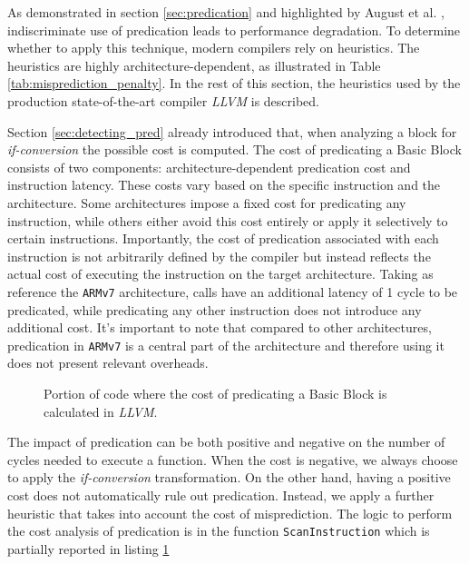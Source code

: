 As demonstrated in section \ref{sec:predication} and highlighted by August et al. \cite{August98}, indiscriminate use of predication leads to performance degradation.
To determine whether to apply this technique, modern compilers rely on heuristics. The heuristics are highly architecture-dependent, as illustrated in Table \ref{tab:misprediction_penalty}. In the rest of this section, the heuristics used by the production state-of-the-art compiler \textit{LLVM} is described.

Section \ref{sec:detecting_pred} already introduced that, when analyzing a block for \textit{if-conversion} the possible cost is computed. The cost of predicating a Basic Block consists of two components: architecture-dependent predication cost and instruction latency. These costs vary based on the specific instruction and the architecture. Some architectures impose a fixed cost for predicating any instruction, while others either avoid this cost entirely or apply it selectively to certain instructions. Importantly, the cost of predication associated with each instruction is not arbitrarily defined by the compiler but instead reflects the actual cost of executing the instruction on the target architecture. Taking as reference the \texttt{ARMv7} architecture, calls have an additional latency of 1 cycle to be predicated, while predicating any other instruction does not introduce any additional cost. It's important to note that compared to other architectures, predication in \texttt{ARMv7} is a central part of the architecture and therefore using it does not present relevant overheads.

\begin{figure}[H]
    \centering
    
    \caption[Predication Cost Calculation]{Portion of code where the cost of predicating a Basic Block is calculated in \textit{LLVM}.}
    \label{lst:predication_cost}
\end{figure}

The impact of predication can be both positive and negative on the number of cycles needed to execute a function. When the cost is negative, we always choose to apply the \textit{if-conversion} transformation. On the other hand, having a positive cost does not automatically rule out predication. Instead, we apply a further heuristic that takes into account the cost of misprediction.
The logic to perform the cost analysis of predication is in the function \texttt{ScanInstruction} which is partially reported in listing \ref{lst:predication_cost}

